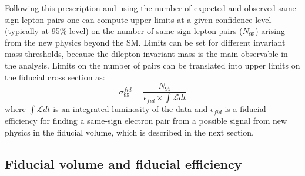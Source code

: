 Following this prescription and using the number of expected and observed same-sign lepton pairs one can compute 
upper limits at a given confidence level (typically at 95$\%$ level) on the number of same-sign lepton pairs ($N_{95}$)
arising from the new physics beyond the SM. Limits can be set for different invariant mass thresholds, 
because the dilepton invariant mass is the main observable in the analysis.
Limits on the number of pairs can be translated into upper limits on the fiducial cross section as:
\begin{equation}
 \sigma_{95}^{fid} = \dfrac{N_{95}}{\epsilon_{fid} \times \int \mathscr{L} dt}
 \label{eq:fid_cross_section}
\end{equation}
where $\int \mathscr{L} dt$ is an integrated luminosity of the data and $\epsilon_{fid}$ is a fiducial efficiency for finding a same-sign electron pair from
a possible signal from new physics in the fiducial volume, which is described in the next section.


\subsection{Fiducial volume and fiducial efficiency}
\label{subsec:fid_volume_eff}


